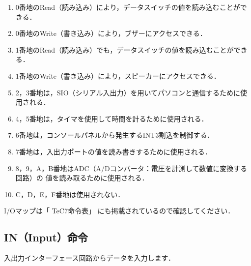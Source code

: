 \begin{enumerate}
\item 0番地のRead（読み込み）により，データスイッチの値を読み込むことができる．
\item 0番地のWrite（書き込み）により，ブザーにアクセスできる．
\item 1番地のRead（読み込み）でも，データスイッチの値を読み込むことができる．
\item 1番地のWrite（書き込み）により，スピーカーにアクセスできる．
\item 2，3番地は，SIO（シリアル入出力）を用いてパソコンと通信するために使用される．
\item 4，5番地は，タイマを使用して時間を計るために使用される．
\item 6番地は，コンソールパネルから発生するINT3割込を制御する．
\item 7番地は，入出力ポートの値を読み書きするために使用される．
\item 8，9，A，B番地はADC（A/Dコンバータ：電圧を計測して数値に変換する回路）の
値を読み取るために使用される．
\item C，D，E，F番地は使用されない．
\end{enumerate}

I/Oマップは「 TeC7命令表」
にも掲載されているので確認してください．

\subsection{IN（Input）命令}

入出力インターフェース回路からデータを入力します．

